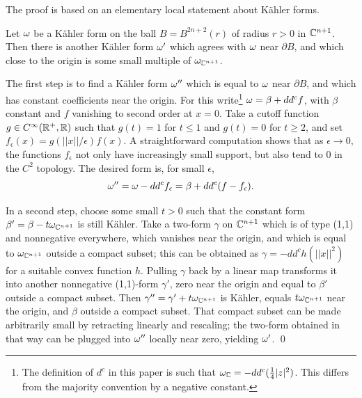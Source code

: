 \documentclass[10pt,letterpaper]{article}
\begin{document}
The proof is based on an elementary local statement about K{\"a}hler forms.

\begin{lemma} \label{th:kaehler}
Let $\omega$ be a K{\"a}hler form on the ball $B = B^{2n+2}(r)$ of radius $r>0$ in
$\mathbb{C}^{n+1}$. Then there is another K{\"a}hler form $\omega'$ which agrees with $\omega$
near $\partial B$, and which close to the origin is some small multiple of
$\omega_{\mathbb{C}^{n+1}}$.
\end{lemma}

\proof The first step is to find a K{\"a}hler form $\omega''$ which is equal to
$\omega$ near $\partial B$, and which has constant coefficients near the origin.
For this write\footnote{The definition of $d^c$ in this paper is such that
$\omega_{\mathbb{C}} = -dd^c({\textstyle\frac{1}{4}}|z|^2)$. This differs from the majority convention by
a negative constant.} $\omega = \beta + dd^c f$, with $\beta$ constant and $f$
vanishing to second order at $x = 0$. Take a cutoff function $g \in
C^\infty(\mathbb{R}^+,\mathbb{R})$ such that $g(t) = 1$ for $t \leq 1$ and $g(t) = 0$ for $t
\geq 2$, and set $f_\epsilon(x) = g(||x||/\epsilon)f(x)$. A straightforward
computation shows that as $\epsilon \rightarrow 0$, the functions $f_\epsilon$
not only have increasingly small support, but also tend to $0$ in the $C^2$
topology. The desired form is, for small $\epsilon$,
\begin{equation} \label{eq:ohalf}
\omega'' = \omega - dd^c f_\epsilon = \beta + dd^c (f - f_\epsilon).
\end{equation}

In a second step, choose some small $t>0$ such that the constant form $\beta' =
\beta - t\omega_{\mathbb{C}^{n+1}}$ is still K{\"a}hler. Take a two-form $\gamma$ on
$\mathbb{C}^{n+1}$ which is of type (1,1) and nonnegative everywhere, which vanishes
near the origin, and which is equal to $\omega_{\mathbb{C}^{n+1}}$ outside a compact
subset; this can be obtained as $\gamma = -dd^c h(||x||^2)$ for a suitable
convex function $h$. Pulling $\gamma$ back by a linear map transforms it into
another nonnegative (1,1)-form $\gamma'$, zero near the origin and equal to
$\beta'$ outside a compact subset. Then $\gamma'' = \gamma' + t\omega_{\mathbb{C}^{n+1}}$
is K{\"a}hler, equals $t\omega_{\mathbb{C}^{n+1}}$ near the origin, and $\beta$ outside a
compact subset. That compact subset can be made arbitrarily small by retracting
linearly and rescaling; the two-form obtained in that way can be plugged into
$\omega''$ locally near zero, yielding $\omega'$. \qed
\end{document}

